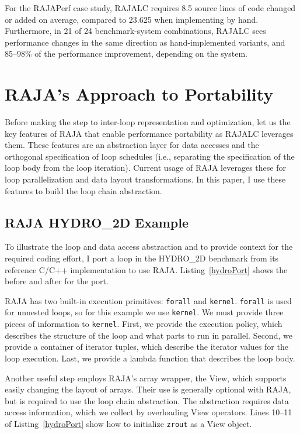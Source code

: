 For the RAJAPerf case study, RAJALC requires 8.5 source lines of code changed or added on average, compared to 23.625 when implementing by hand.
Furthermore, in 21 of 24 benchmark-system combinations, RAJALC sees performance changes in the same direction as hand-implemented variants, and 85--98\% of the performance improvement, depending on the system.

\section{RAJA's Approach to Portability}

Before making the step to inter-loop representation and optimization, let us the key features of RAJA that enable performance portability
as RAJALC leverages them.
These features are an abstraction layer for data accesses and the
orthogonal specification of loop schedules
(i.e., separating the specification of the loop body from the loop iteration).
Current usage of RAJA leverages these for loop parallelization and
data layout transformations.
In this paper, I use these features to build the loop chain abstraction.

\subsection{RAJA HYDRO\_2D Example}
To illustrate the loop and data access abstraction and to provide context
for the required coding effort, I port a loop in the HYDRO\_2D benchmark
from its reference C/C++ implementation to use RAJA\@.
Listing~\ref{hydroPort} shows the before and after for the port.

RAJA has two built-in execution primitives: \verb.forall. and \verb.kernel..
\verb.forall. is used for unnested loops, so for this example we use
\verb.kernel..
We must provide three pieces of information to \verb.kernel.. 
First, we provide the execution policy, which describes the structure of
the loop and what parts to run in parallel.
Second, we provide a container of iterator tuples, which describe the
iterator values for the loop execution.
Last, we provide a lambda function that describes the loop body.


Another useful step employs RAJA's array wrapper, the View, which supports
easily changing the layout of arrays.
Their use is generally optional with RAJA, but is required to use the loop
chain abstraction.
The abstraction requires data access information, which we collect by
overloading View operators.
Lines 10--11 of Listing~\ref{hydroPort} show how to initialize \verb.zrout.
as a View object.

